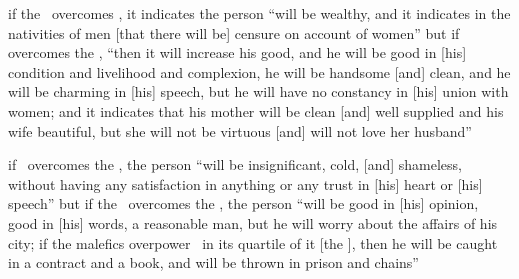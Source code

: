 \begin{description}[style=multiline,leftmargin=1.5cm]
\item[\Moon\Square\Venus] if the \Moon\, overcomes \Venus, it indicates the person ``will be wealthy, and it indicates in the nativities of men [that there will be] censure on account of women'' but if \Venus\, overcomes the \Moon, ``then it will increase his good, and he will be good in [his] condition and livelihood and complexion, he will be handsome [and] clean, and he will be charming in [his] speech, but he will have no constancy in [his] union with women; and it indicates that his mother will be clean [and] well supplied and his wife beautiful, but she will not be virtuous [and] will not love her husband''

\item[\Mercury\Square\Moon] if \Mercury\, overcomes the \Moon, the person ``will be insignificant, cold, [and] shameless, without having any satisfaction in anything or any trust in [his] heart or [his] speech''  but if the \Moon\, overcomes the \Mercury, the person ``will be good in [his] opinion, good in [his] words, a reasonable man, but he will worry about the affairs of his city; if the malefics overpower \Mercury\, in its quartile of it [the \Moon], then he will be caught in a contract and a book, and will be thrown in prison and chains'' 
\end{description}